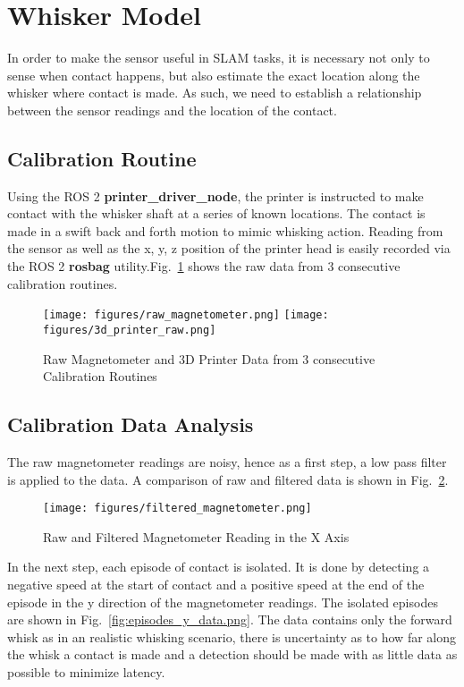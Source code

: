 \documentclass{article}
\begin{document}
\section{Whisker Model}

In order to make the sensor useful in SLAM tasks, it is necessary not  only to sense when contact happens, but also estimate the exact location along the whisker where contact is made. As such, we need to establish a relationship between the sensor readings and the location of the contact.

\subsection{Calibration Routine}

Using the ROS 2 \textbf{printer\_driver\_node}, the printer is instructed to make contact with the whisker shaft at a series of known locations. The contact is made in a swift back and forth motion to mimic whisking action. Reading from the sensor as well as the x, y, z position of the printer head is easily recorded via the ROS 2 \textbf{rosbag} utility.Fig.~\ref{fig:calibration_routine} shows the raw data from 3 consecutive calibration routines.

\begin{figure}[h]
    \centering
    \texttt{[image: figures/raw\_magnetometer.png]}
    \texttt{[image: figures/3d\_printer\_raw.png]}
    \caption{Raw Magnetometer and 3D Printer Data from 3 consecutive Calibration Routines}
    \label{fig:calibration_routine}
\end{figure}

\subsection{Calibration Data Analysis}\label{sec:calibration_data_analysis}

The raw magnetometer readings are noisy, hence as a first step, a low pass filter is applied to the data. A comparison of raw and filtered data is shown in Fig.~\ref{fig:filtered_magnetometer}.

\begin{figure}[h]
    \centering
    \texttt{[image: figures/filtered\_magnetometer.png]}
    \caption{Raw and Filtered Magnetometer Reading in the X Axis }
    \label{fig:filtered_magnetometer}
\end{figure}

In the next step, each episode of contact is isolated. It is done by detecting a negative speed at the start of contact and a positive speed at the end of the episode in the y direction of the magnetometer readings. The isolated episodes are shown in Fig.~\ref{fig:episodes_y_data.png}. The data contains only the forward whisk as in an realistic whisking scenario, there is uncertainty as to how far along the whisk a contact is made and a detection should be made with as little data as possible to minimize latency.
\end{document}
